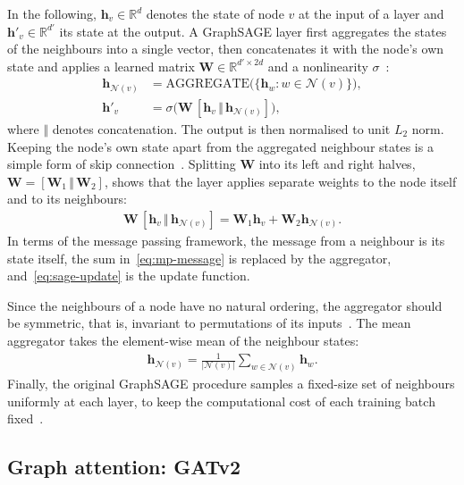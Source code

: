In the following, $\mathbf{h}_v \in \mathbb{R}^d$ denotes the state of node $v$ at the input of a layer and $\mathbf{h}'_v \in \mathbb{R}^{d'}$ its state at the output. A GraphSAGE layer first aggregates the states of the neighbours into a single vector, then concatenates it with the node's own state and applies a learned matrix $\mathbf{W} \in \mathbb{R}^{d' \times 2d}$ and a nonlinearity $\sigma$~\cite{hamilton2017inductive}:
\begin{align}
  \mathbf{h}_{\mathcal{N}(v)} &= \mathrm{AGGREGATE}\big(\{\mathbf{h}_w : w \in \mathcal{N}(v)\}\big), \label{eq:sage-aggregate} \\
  \mathbf{h}'_v &= \sigma\big(\mathbf{W} \, [\mathbf{h}_v \,\Vert\, \mathbf{h}_{\mathcal{N}(v)}]\big), \label{eq:sage-update}
\end{align}
where $\Vert$ denotes concatenation. The output is then normalised to unit $L_2$ norm. Keeping the node's own state apart from the aggregated neighbour states is a simple form of skip connection~\cite{hamilton2017inductive}. Splitting $\mathbf{W}$ into its left and right halves, $\mathbf{W} = [\mathbf{W}_1 \,\Vert\, \mathbf{W}_2]$, shows that the layer applies separate weights to the node itself and to its neighbours:
\begin{align}
  \mathbf{W} \, [\mathbf{h}_v \,\Vert\, \mathbf{h}_{\mathcal{N}(v)}] = \mathbf{W}_1 \mathbf{h}_v + \mathbf{W}_2 \mathbf{h}_{\mathcal{N}(v)}.
  \label{eq:sage-split}
\end{align}
In terms of the message passing framework, the message from a neighbour is its state itself, the sum in~\eqref{eq:mp-message} is replaced by the aggregator, and~\eqref{eq:sage-update} is the update function.

Since the neighbours of a node have no natural ordering, the aggregator should be symmetric, that is, invariant to permutations of its inputs~\cite{hamilton2017inductive}. The mean aggregator takes the element-wise mean of the neighbour states:
\begin{align}
  \mathbf{h}_{\mathcal{N}(v)} = \frac{1}{|\mathcal{N}(v)|} \sum_{w \in \mathcal{N}(v)} \mathbf{h}_w.
  \label{eq:sage-mean}
\end{align}
Finally, the original GraphSAGE procedure samples a fixed-size set of neighbours uniformly at each layer, to keep the computational cost of each training batch fixed~\cite{hamilton2017inductive}.

\subsection{Graph attention: GATv2}
\label{sec:gatv2}

